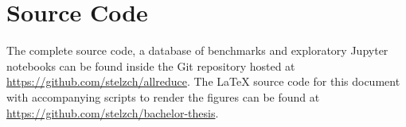\section{Source Code}
The complete source code, a database of benchmarks and exploratory Jupyter notebooks can be found inside the Git repository hosted at \url{https://github.com/stelzch/allreduce}.
The \LaTeX{} source code for this document with accompanying scripts to render the figures can be found at \url{https://github.com/stelzch/bachelor-thesis}.
